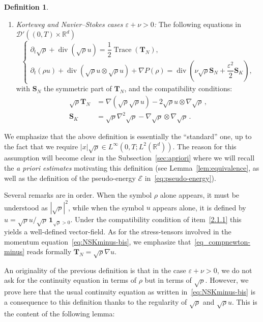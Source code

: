 \documentclass[11pt]{article}
\theoremstyle{definition}
\newtheorem{defi}[theo]{Definition}
\numberwithin{equation}{section}
\numberwithin{figure}{section}
\numberwithin{table}{section}
\DeclareMathOperator{\DIV}{div}
\DeclareMathOperator{\Trace}{Trace}
\newcommand*\R{\mathbb{R}}
\newcommand*\<{\left\langle}
\renewcommand*\>{\right\rangle}
\newcommand*\eps{\varepsilon}
\begin{document}
\begin{defi}
\begin{enumerate}
\item \label{2.1.3} \emph{Korteweg and Navier--Stokes cases $\eps + \nu > 0$:} The following equations in $\mathcal D'((0,T)\times \mathbb R^d)$
\begin{equation}\label{eq:NSKminus-bis}
\begin{cases}
\partial_t\sqrt{\rho}+\DIV (\sqrt{\rho} u)= \dfrac{1}{2}\Trace(\mathbf T_N),\\
\partial_t ({\rho}u) +\DIV (\sqrt{\rho}u \otimes \sqrt{\rho}u) + \nabla P(\rho) =\DIV \left(\nu\sqrt \rho \mathbf S_N + \dfrac{\varepsilon^2}{2} \mathbf S_K\right)\!,
\end{cases}
\end{equation}
with $\mathbf S_N$ the symmetric part of $\mathbf T_N$, and the compatibility conditions:
\begin{align}\label{eq_compnewton-minus}
\sqrt{\rho}\mathbf T_{N} &= \nabla(\sqrt{\rho} \sqrt{\rho} u) - 2 \sqrt{\rho}u \otimes \nabla \sqrt{\rho}\,, \\
\mathbf S_K &=\sqrt{\rho}\nabla^2 \sqrt{\rho} - \nabla \sqrt{\rho} \otimes \nabla
\sqrt{\rho}\,. \label{eq_compbohm-minus}
\end{align}
\end{enumerate}
\end{defi}

We emphasize that the above definition is essentially the ``standard'' one, up to the fact that we require $|x|\sqrt\rho\in L^\infty(0,T;L^2(\R^d))$. The reason for this assumption will become clear in the Subsection~\ref{sec:apriori} where we will recall the \emph{a priori estimates} motivating this definition (see Lemma~\ref{lem:equivalence}, as well as the definition of the pseudo-energy $\mathcal E$ in~\eqref{eq:pseudo-energy}).

Several remarks are in order. When the symbol $\rho$ alone appears, it must be understood as $|\sqrt{\rho}|^2$, while when the symbol $u$ appears alone, it is defined by $u =
\sqrt{\rho}u/\sqrt{\rho}\,\mathbf 1_{\sqrt{\rho}>0}.$ Under the compatibility condition of item~\eqref{2.1.1} this yields a well-defined vector-field. As for the stress-tensors involved in the momentum equation~\eqref{eq:NSKminus-bis}, we emphasize that~\eqref{eq_compnewton-minus} reads formally $\mathbf T_N = \sqrt{\rho} \nabla u.$

An originality of the previous definition is that in the case $\eps+\nu>0$, we do not ask for the continuity equation in terms of $\rho$ but in terms of $\sqrt{\rho}.$ However, we prove here that the usual continuity equation as written in~\eqref{eq:NSKminus-bis} is a consequence to this definition thanks to the regularity of $\sqrt{\rho}$ and $\sqrt{\rho}u.$ This is the content of the following lemma:
\end{document}
